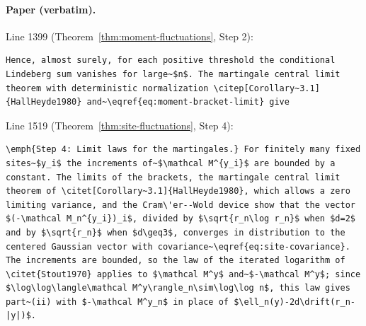 \paragraph{Paper (verbatim).} Line 1399 (Theorem~\ref{thm:moment-fluctuations}, Step 2):
\begin{verbatim}
Hence, almost surely, for each positive threshold the conditional Lindeberg sum vanishes for large~$n$. The martingale central limit theorem with deterministic normalization \citep[Corollary~3.1]{HallHeyde1980} and~\eqref{eq:moment-bracket-limit} give
\end{verbatim}
Line 1519 (Theorem~\ref{thm:site-fluctuations}, Step 4):
\begin{verbatim}
\emph{Step 4: Limit laws for the martingales.} For finitely many fixed sites~$y_i$ the increments of~$\mathcal M^{y_i}$ are bounded by a constant. The limits of the brackets, the martingale central limit theorem of \citet[Corollary~3.1]{HallHeyde1980}, which allows a zero limiting variance, and the Cram\'er--Wold device show that the vector $(-\mathcal M_n^{y_i})_i$, divided by $\sqrt{r_n\log r_n}$ when $d=2$ and by $\sqrt{r_n}$ when $d\geq3$, converges in distribution to the centered Gaussian vector with covariance~\eqref{eq:site-covariance}. The increments are bounded, so the law of the iterated logarithm of \citet{Stout1970} applies to $\mathcal M^y$ and~$-\mathcal M^y$; since $\log\log\langle\mathcal M^y\rangle_n\sim\log\log n$, this law gives part~(ii) with $-\mathcal M^y_n$ in place of $\ell_n(y)-2d\drift(r_n-|y|)$.
\end{verbatim}
